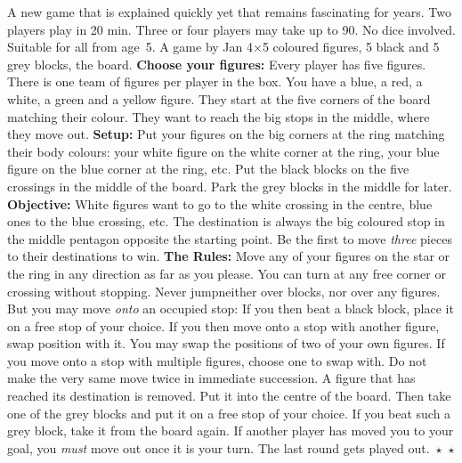 \shapepar{\starshape}
A new game that is explained quickly yet that 
remains 
fascinating for years. 
Two players play in 20 min. Three or four players
may take up to 90. 
No dice involved. Suitable for all  from
age~5. A game by Jan  
4$\times$5 coloured figures, 5 black and
5 grey blocks, the board.
\textsf{\textbf{Choose your figures: }}
Every player has five figures. There is one team of figures per player in the box. 
You have a blue, a red, a white, a green and a yellow figure. 
They start at the five corners of the board matching their colour.
They want to reach the big stops in the middle, where they move out.
\textsf{\textbf{Setup: } }
Put your figures on the big corners at the ring matching their body colours: 
your white figure on the white corner at the ring, your blue figure on the blue corner at the ring, etc.
Put the black blocks on the five crossings in the middle of the board. 
Park the grey blocks in the middle for later. 
\textsf{\textbf{Objective: }}
White figures want to go to the white crossing in the centre, blue
ones to the blue crossing, etc. The destination is always the big
coloured stop in the middle pentagon opposite the starting point.
Be the first to move \emph{three} pieces to their destinations to win.
\textsf{\textbf{The Rules: }}
Move any of your figures on the star or the ring in any direction as far as you please. 
You can turn at any free corner or crossing without stopping.
Never jump\textemdash neither over blocks, nor over any figures. 
But you may move \emph{onto} an occupied stop:
If you then beat a black block, place it on a free stop of your choice.
If you then move onto a stop with another figure, swap position with it.
You may swap the positions of two of your own figures. 
If you move onto a stop with multiple figures, choose one to swap with.
Do not make the very same move twice in immediate succession.  
A figure that has reached its destination is removed. Put it into the centre of the board. Then take one of the grey blocks and put it on a free stop of your choice.
If you beat such a grey block, take it from the board again.
If another player has  moved you to your goal, you \emph{must }move out once it is your turn.  
The last round gets played out.
$\!\!\star$   $\star$%